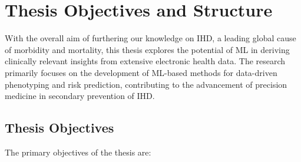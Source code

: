 \chapter{Thesis Objectives and Structure} 
\label{chap:overview}

With the overall aim of furthering our knowledge on \ac{IHD},
a leading global cause of morbidity and mortality,
this thesis explores the potential of \ac{ML} in deriving
clinically relevant insights from extensive electronic health data. 
The research primarily focuses on the development of \ac{ML}-based
methods for data-driven phenotyping and risk prediction,
contributing to the advancement of 
precision medicine in secondary prevention of \ac{IHD}. 

\section*{Thesis Objectives}

The primary objectives of the thesis are:

